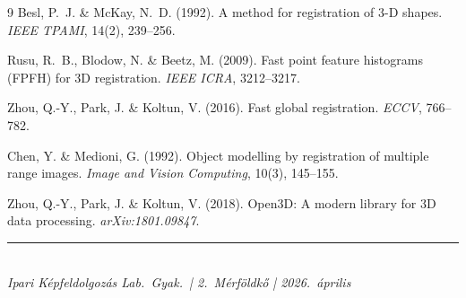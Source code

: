 \documentclass[12pt,a4paper]{article}
\begin{document}
\begin{thebibliography}{9}
Besl, P.~J. \& McKay, N.~D. (1992).
A method for registration of 3-D shapes.
\textit{IEEE TPAMI}, 14(2), 239--256.

Rusu, R.~B., Blodow, N. \& Beetz, M. (2009).
Fast point feature histograms (FPFH) for 3D registration.
\textit{IEEE ICRA}, 3212--3217.

Zhou, Q.-Y., Park, J. \& Koltun, V. (2016).
Fast global registration.
\textit{ECCV}, 766--782.

Chen, Y. \& Medioni, G. (1992).
Object modelling by registration of multiple range images.
\textit{Image and Vision Computing}, 10(3), 145--155.

Zhou, Q.-Y., Park, J. \& Koltun, V. (2018).
Open3D: A modern library for 3D data processing.
\textit{arXiv:1801.09847}.
\end{thebibliography}

\vfill
\noindent\rule{\textwidth}{0.4pt}\\
\small\textit{Ipari Képfeldolgozás Lab.\ Gyak.\ | 2.~Mérföldkő | 2026.~április}
\end{document}

